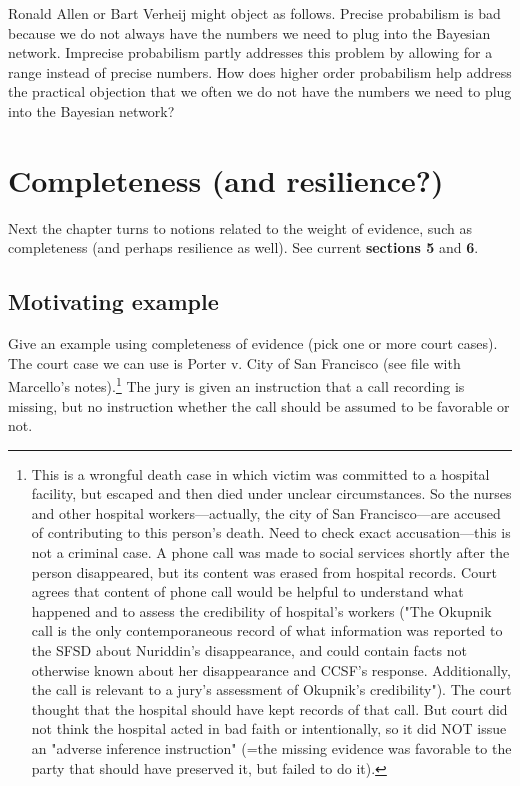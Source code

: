 \documentclass[
  10pt,
  dvipsnames,enabledeprecatedfontcommands]{scrartcl}
\begin{document}
Ronald Allen or Bart Verheij might object as follows. Precise
probabilism is bad because we do not always have the numbers we need to
plug into the Bayesian network. Imprecise probabilism partly addresses
this problem by allowing for a range instead of precise numbers. How
does higher order probabilism help address the practical objection that
we often we do not have the numbers we need to plug into the Bayesian
network?

\hypertarget{completeness-and-resilience-1}{%
\section{Completeness (and
resilience?)}\label{completeness-and-resilience-1}}

Next the chapter turns to notions related to the weight of evidence,
such as completeness (and perhaps resilience as well). See current
\textbf{sections 5} and \textbf{6}.

\hypertarget{motivating-example}{%
\subsection{Motivating example}\label{motivating-example}}

Give an example using completeness of evidence (pick one or more court
cases). The court case we can use is Porter v. City of San Francisco
(see file with Marcello's
notes).\footnote{This is a wrongful death case in which victim was committed to a hospital facility, but escaped and then died under unclear circumstances. So the nurses and other hospital workers---actually, the city of San Francisco---are accused of contributing to this person's death. Need to check exact accusation---this is not a criminal case. A phone call was made to social services shortly after the person disappeared, but its content was erased from hospital records. Court agrees that content of phone call would be helpful to understand what happened and to assess the credibility of hospital's workers ("The Okupnik call is the only contemporaneous record of what information was reported to the SFSD about Nuriddin’s disappearance, and could contain facts not otherwise known about her disappearance and CCSF’s response. Additionally, the call is relevant to a jury’s assessment of Okupnik’s credibility"). The court thought that the hospital should have kept records of that call. But court did not think the hospital acted in bad faith or intentionally, so it did NOT issue an "adverse inference instruction" (=the missing evidence was favorable to the party that should have preserved it, but failed to do it).}
The jury is given an instruction that a call recording is missing, but
no instruction whether the call should be assumed to be favorable or
not.
\end{document}
